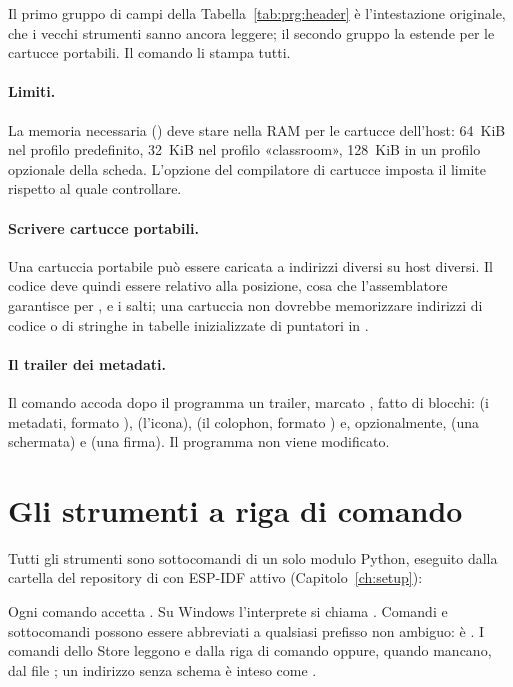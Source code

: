Il primo gruppo di campi della Tabella~\ref{tab:prg:header} è l'intestazione
originale, che i vecchi strumenti sanno ancora leggere; il secondo gruppo la
estende per le cartucce portabili. Il comando  li
stampa tutti.

\paragraph{Limiti.} La memoria necessaria () deve stare nella
RAM per le cartucce dell'host: 64~KiB nel profilo predefinito, 32~KiB nel
profilo «classroom», 128~KiB in un profilo opzionale della scheda. L'opzione
 del compilatore di cartucce imposta il limite rispetto
al quale controllare.

\paragraph{Scrivere cartucce portabili.} Una cartuccia portabile può essere
caricata a indirizzi diversi su host diversi. Il codice deve quindi essere
relativo alla posizione, cosa che l'assemblatore garantisce per ,
 e i salti; una cartuccia non dovrebbe memorizzare indirizzi di
codice o di stringhe in tabelle inizializzate di puntatori in .

\paragraph{Il trailer dei metadati.} Il comando 
accoda dopo il programma un trailer, marcato , fatto di
blocchi:  (i metadati, formato ),
 (l'icona),  (il colophon, formato
) e, opzionalmente,  (una schermata) e
 (una firma). Il programma non viene modificato.

\section{Gli strumenti a riga di comando}

Tutti gli strumenti sono sottocomandi di un solo modulo Python, eseguito dalla
cartella del repository di \prg con ESP-IDF attivo
(Capitolo~\ref{ch:setup}):
\begin{center}\end{center}
Ogni comando accetta . Su Windows l'interprete si chiama
. Comandi e sottocomandi possono essere abbreviati a qualsiasi
prefisso non ambiguo:  è . I
comandi dello Store leggono  e  dalla riga
di comando oppure, quando mancano, dal file
; un indirizzo senza schema è inteso
come .

